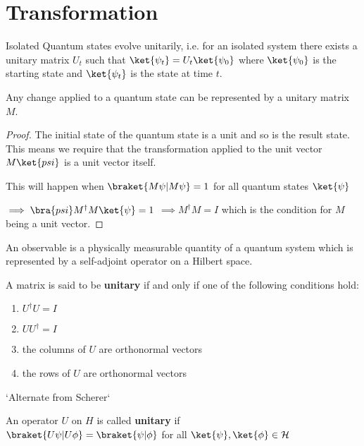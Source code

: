 \section{Transformation}

\begin{lemma}
    Isolated Quantum states evolve unitarily, i.e. for an isolated system there exists a unitary matrix $U_t$ such that $\ket{\psi_t} = U_t \ket{\psi_0}$ where $\ket{\psi_0}$ is the starting state and $\ket{\psi_t}$ is the state at time $t$.
\end{lemma}

\begin{thm}
    Any change applied to a quantum state can be represented by a unitary matrix $M$.
\end{thm}
\begin{proof}
    The initial state of the quantum state is a unit and so is the result state. This means we require that the transformation applied to the unit vector $M \ket{psi}$ is a unit vector itself.

    This will happen when $\braket{M \psi | M\psi} = 1$ for all quantum states $\ket{\psi}$

    $\implies \bra{psi} M^\dagger M \ket{\psi} = 1$
    $\implies M^\dagger M = I$ which is the condition for $M$ being a unit vector.
\end{proof}


\begin{defn}
    An observable is a physically measurable quantity of a quantum system which is represented by a self-adjoint operator on a Hilbert space.
\end{defn}

\begin{defn}
    A matrix is said to be \textbf{unitary} if and only if one of the following conditions hold:
    \begin{enumerate}
        \item $U^\dagger U = I$
        \item $U U^\dagger = I$
        \item the columns of $U$ are orthonormal vectors
        \item the rows of $U$ are orthonormal vectors
    \end{enumerate}
\end{defn}

`Alternate from Scherer`
\begin{defn}
    An operator $U$ on $H$ is called \textbf{unitary} if \\
    $\braket{U \psi | U \phi } = \braket{\psi | \phi }$ for all $\ket{\psi}, \ket{\phi} \in \mathcal{H}$
\end{defn}

